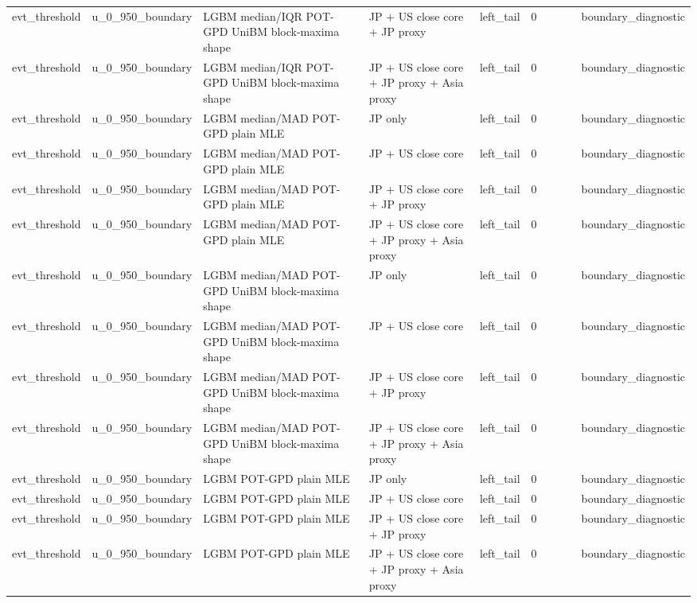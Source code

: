 \begin{tabular}{lll l lrrrrl}
evt\_threshold & u\_0\_950\_boundary & LGBM median/IQR POT-GPD UniBM block-maxima shape & JP + US close core + JP proxy & left\_tail & 0 &  &  &  & boundary\_diagnostic \\
evt\_threshold & u\_0\_950\_boundary & LGBM median/IQR POT-GPD UniBM block-maxima shape & JP + US close core + JP proxy + Asia proxy & left\_tail & 0 &  &  &  & boundary\_diagnostic \\
evt\_threshold & u\_0\_950\_boundary & LGBM median/MAD POT-GPD plain MLE & JP only & left\_tail & 0 &  &  &  & boundary\_diagnostic \\
evt\_threshold & u\_0\_950\_boundary & LGBM median/MAD POT-GPD plain MLE & JP + US close core & left\_tail & 0 &  &  &  & boundary\_diagnostic \\
evt\_threshold & u\_0\_950\_boundary & LGBM median/MAD POT-GPD plain MLE & JP + US close core + JP proxy & left\_tail & 0 &  &  &  & boundary\_diagnostic \\
evt\_threshold & u\_0\_950\_boundary & LGBM median/MAD POT-GPD plain MLE & JP + US close core + JP proxy + Asia proxy & left\_tail & 0 &  &  &  & boundary\_diagnostic \\
evt\_threshold & u\_0\_950\_boundary & LGBM median/MAD POT-GPD UniBM block-maxima shape & JP only & left\_tail & 0 &  &  &  & boundary\_diagnostic \\
evt\_threshold & u\_0\_950\_boundary & LGBM median/MAD POT-GPD UniBM block-maxima shape & JP + US close core & left\_tail & 0 &  &  &  & boundary\_diagnostic \\
evt\_threshold & u\_0\_950\_boundary & LGBM median/MAD POT-GPD UniBM block-maxima shape & JP + US close core + JP proxy & left\_tail & 0 &  &  &  & boundary\_diagnostic \\
evt\_threshold & u\_0\_950\_boundary & LGBM median/MAD POT-GPD UniBM block-maxima shape & JP + US close core + JP proxy + Asia proxy & left\_tail & 0 &  &  &  & boundary\_diagnostic \\
evt\_threshold & u\_0\_950\_boundary & LGBM POT-GPD plain MLE & JP only & left\_tail & 0 &  &  &  & boundary\_diagnostic \\
evt\_threshold & u\_0\_950\_boundary & LGBM POT-GPD plain MLE & JP + US close core & left\_tail & 0 &  &  &  & boundary\_diagnostic \\
evt\_threshold & u\_0\_950\_boundary & LGBM POT-GPD plain MLE & JP + US close core + JP proxy & left\_tail & 0 &  &  &  & boundary\_diagnostic \\
evt\_threshold & u\_0\_950\_boundary & LGBM POT-GPD plain MLE & JP + US close core + JP proxy + Asia proxy & left\_tail & 0 &  &  &  & boundary\_diagnostic \\

\end{tabular}
